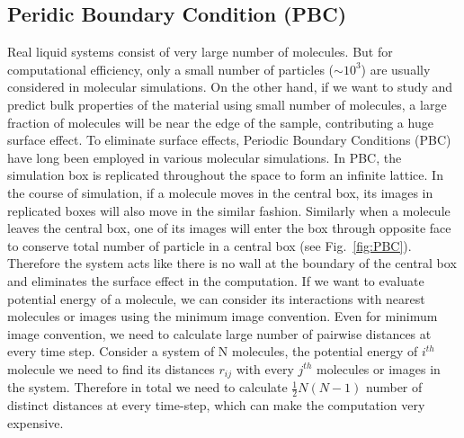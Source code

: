 \subsection{Peridic Boundary Condition (PBC)}
Real liquid systems consist of very large number of molecules. But for computational efficiency, only a small number of particles ($\sim 10^3$) are usually considered in molecular simulations. On the other hand, if we want to study and predict bulk properties of the material using small number of molecules, a large fraction of molecules will be near the edge of the sample, contributing a huge surface effect. To eliminate surface effects, Periodic Boundary Conditions (PBC) have long been employed in various molecular simulations.\cite{Born1912}
In PBC, the simulation box is replicated throughout the space to form an infinite lattice. In the course of simulation, if a molecule moves in the central box, its images in replicated boxes will also move in the similar fashion. Similarly when a molecule leaves the central box, one of its images will enter the box through opposite face to conserve total number of particle in a central box (see Fig.~\ref{fig:PBC}). Therefore the system acts like there is no wall at the boundary of the central box and eliminates the surface effect in the computation. If we want to evaluate potential energy of a molecule, we can consider its interactions with nearest molecules or images using the minimum image convention.\cite{Allen04} Even for minimum image convention, we need to calculate large number of pairwise distances at every time step. Consider a system of N molecules, the potential energy of $i^{th}$ molecule we need to find its distances $r_{ij}$ with every $j^{th}$ molecules or images in the system. Therefore in total we need to calculate $\frac{1}{2} N (N-1)$ number of distinct distances at every time-step, which can make the computation very expensive. 

